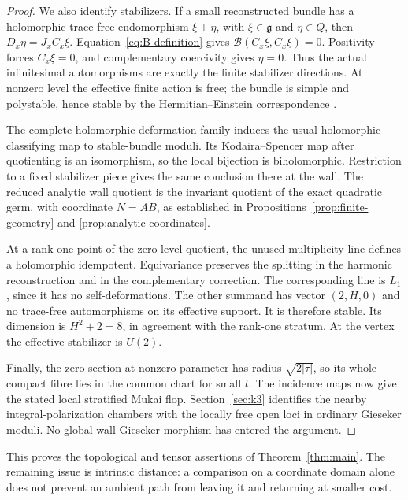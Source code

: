 \begin{proof}
We also identify stabilizers. If a small reconstructed bundle has a
holomorphic trace-free endomorphism $\xi+\eta$, with
$\xi\in\mathfrak g$ and $\eta\in Q$, then
$D_x\eta=J_xC_x\xi$. Equation~\eqref{eq:B-definition} gives
$\mathcal B(C_x\xi,C_x\xi)=0$. Positivity forces $C_x\xi=0$,
and complementary coercivity gives $\eta=0$. Thus the actual
infinitesimal automorphisms are exactly the finite stabilizer
directions. At nonzero level the effective finite action is free;
the bundle is simple and polystable, hence stable by the
Hermitian--Einstein correspondence \cite{Don85,UY86}.

The complete holomorphic deformation family induces the usual
holomorphic classifying map to stable-bundle moduli. Its
Kodaira--Spencer map after quotienting is an isomorphism, so the
local bijection is biholomorphic. Restriction to a fixed stabilizer
piece gives the same conclusion there at the wall. The reduced
analytic wall quotient is the invariant quotient of the exact
quadratic germ, with coordinate $N=AB$, as established in
Propositions~\ref{prop:finite-geometry} and
\ref{prop:analytic-coordinates}.

At a rank-one point of the zero-level quotient, the unused multiplicity line
defines a holomorphic idempotent. Equivariance preserves the splitting
in the harmonic reconstruction and in the complementary correction.
The corresponding line is $L_1$, since it has no self-deformations.
The other summand has vector $(2,H,0)$ and no trace-free
automorphisms on its effective support. It is therefore stable.
Its dimension is $H^2+2=8$, in agreement with the rank-one stratum.
At the vertex the effective stabilizer is $U(2)$.

Finally, the zero section at nonzero parameter has radius
$\sqrt{2|\tau|}$, so its whole compact fibre lies in the common
chart for small $t$. The incidence maps now give the stated local
stratified Mukai flop. Section~\ref{sec:k3} identifies the nearby
integral-polarization chambers with the locally free open loci in
ordinary Gieseker moduli. No global wall-Gieseker morphism has
entered the argument.
\end{proof}

This proves the topological and tensor assertions of
Theorem~\ref{thm:main}. The remaining issue is intrinsic distance:
a comparison on a coordinate domain alone does not prevent an ambient
path from leaving it and returning at smaller cost.
